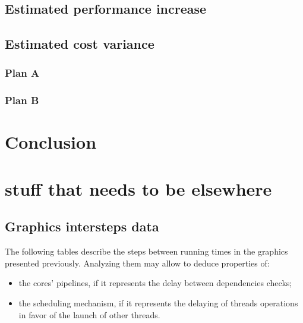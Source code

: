 \documentclass{report}
\begin{document}
   \section{Estimated performance increase}
   \section{Estimated cost variance}
   \subsection{Plan A}
   \subsection{Plan B}
   
\chapter{Conclusion}   
   
   
  \appendix 
   
\chapter{stuff that needs to be elsewhere}
    \section{Graphics intersteps data}
    The following tables describe the steps between running times in the graphics presented previously. Analyzing them may allow to deduce properties of: 
    \begin{itemize} 
        \item the cores' pipelines, if it represents the delay between dependencies checks;
        \item the scheduling mechanism, if it represents the delaying of threads operations in favor of the launch of other threads.
    \end{itemize}
    
    \centering
    
    
    \pagebreak
    
\end{document}
